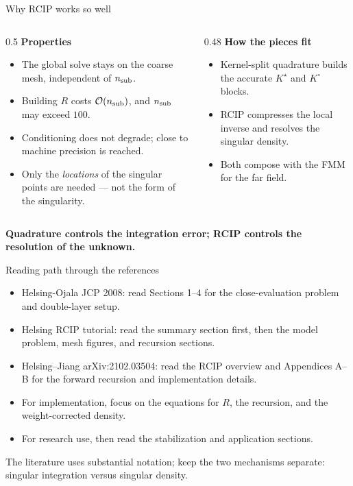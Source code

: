 \documentclass[aspectratio=169,11pt]{beamer}
\newcommand{\cO}{\mathcal{O}}
\newcommand{\hl}[1]{{\color{CCMorange}\textbf{#1}}}
\begin{document}
\begin{frame}{Why RCIP works so well}
\small
\begin{columns}[T,totalwidth=\textwidth]
\begin{column}{0.5\textwidth}
\textbf{Properties}
\begin{itemize}
  \item The global solve stays on the coarse mesh, independent of $n_{\rm sub}$.
  \item Building $R$ costs $\cO(n_{\rm sub})$, and $n_{\rm sub}$ may exceed
  $100$.
  \item Conditioning does not degrade; close to machine precision is reached.
  \item Only the \emph{locations} of the singular points are needed --- not the
  form of the singularity.
\end{itemize}
\end{column}
\begin{column}{0.48\textwidth}
\textbf{How the pieces fit}
\begin{itemize}
  \item Kernel-split quadrature builds the accurate $K^\star$ and $K^\circ$
  blocks.
  \item RCIP compresses the local inverse and resolves the singular density.
  \item Both compose with the FMM for the far field.
\end{itemize}
\end{column}
\end{columns}

\vspace{3mm}
\begin{center}
\hl{Quadrature controls the integration error; RCIP controls the resolution of the unknown.}
\end{center}
\end{frame}

\begin{frame}{Reading path through the references}
\small
\begin{itemize}
  \item Helsing-Ojala JCP 2008: read Sections 1--4 for the close-evaluation problem and double-layer setup.
  \item Helsing RCIP tutorial: read the summary section first, then the model problem, mesh figures, and recursion sections.
  \item Helsing--Jiang arXiv:2102.03504: read the RCIP overview and Appendices A--B for the forward recursion and implementation details.
  \item For implementation, focus on the equations for $R$, the recursion, and the weight-corrected density.
  \item For research use, then read the stabilization and application sections.
\end{itemize}

\vspace{2mm}
The literature uses substantial notation; keep the two mechanisms separate:
singular integration versus singular density.
\end{frame}
\end{document}
